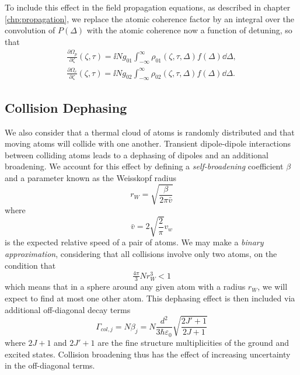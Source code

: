     To include this effect in the field propagation equations, as described in chapter \ref{chp:propagation}, we replace the atomic coherence factor by an
    integral over the convolution of $P(\Delta)$ with the atomic coherence now a function of detuning, so that
    \begin{subequations}\label{eqn:mwe_svea_doppler}
    \begin{align}
      \frac{\partial \Omega_p}{\partial \zeta}(\zeta, \tau) = \ii N g_{01} 
      \int_{-\infty}^{\infty} \rho_{01}(\zeta, \tau, \Delta) f(\Delta) \dd 
      \Delta, \\
      \frac{\partial \Omega_c}{\partial \zeta}(\zeta, \tau) = \ii N g_{02} 
      \int_{-\infty}^{\infty} \rho_{02}(\zeta, \tau, \Delta) f(\Delta) \dd
      \Delta.
    \end{align}
    \end{subequations}

  \subsection{Collision Dephasing}

    We also consider that a thermal cloud of atoms is randomly distributed and
    that moving atoms will collide with one another. Transient dipole-dipole
    interactions between colliding atoms leads to a dephasing of dipoles and an
    additional broadening. We account for this effect by
    defining a \textit {self-broadening} coefficient $\beta$ and a parameter
    known as the Weisskopf radius\cite{Lewis1980}
    \begin{equation}\label{eqn:weisskopf}
      r_W = \sqrt{\frac{\beta}{2\pi \bar{v}}}
    \end{equation}
    where
    \begin{equation}\label{eqn:mean_vel}
    \bar{v} = 2 \sqrt{\frac{2}{\pi}} v_w
    \end{equation}
    is the expected relative speed of a pair of atoms. We may make a
    \textit{binary approximation}, considering that all collisions involve only
    two atoms, on the condition that\cite{thorne1999spectrophysics}
    \begin{equation}\label{eqn:weisskopf_cond}
      \tfrac{4\pi}{3}Nr_W^3 < 1
    \end{equation}
    which means that in a sphere around any given atom with a radius $r_W$, we
    will expect to find at most one other atom. This dephasing effect is then included via additional off-diagonal decay terms
    \begin{equation}\label{eqn:collision_broad}
      \Gamma_{col,j} = N \beta_j = 
        N \frac{d^2}{3 \hbar \varepsilon_0}\sqrt{\frac{2J'+1}{2J+1}}
    \end{equation}      
    where $2J + 1$ and $2J' + 1$ are the fine structure multiplicities of the
    ground and excited states.\cite{Weller2011, Lewis1980} Collision broadening
    thus has the effect of increasing uncertainty in the off-diagonal terms.

